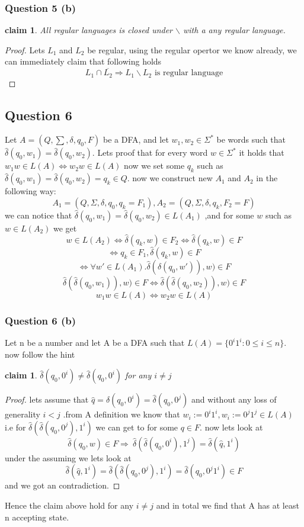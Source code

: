 \documentclass[12pt]{article}
\newtheorem{claim}[theorem]{claim}
\begin{document}
\subsubsection*{Question 5 (b)}
\begin{claim}
All regular languages is closed under $\backslash$ with a
any regular language.
\end{claim}
\begin{proof}
Lets $L_1$ and $L_2$ be regular, using the regular opertor  we know already, we can immediately claim that following holds 
\[ L_1 \cap \overline{L_2} \Rightarrow L_1\backslash L_2 \text{ is regular language} 
\]
\end{proof}
\subsection*{Question 6}
Let  $A=(Q,\sum,\delta,q_0,F)$ be a DFA, and let $w_1,w_2 \in \Sigma^*$ be words such that $\hat{\delta}(q_0, w_1) = \hat{\delta}(q_0, w_2).$
Lets proof that for every word $ w \in \Sigma^*$
it holds that $w_1w \in L(A) \Leftrightarrow w_2w \in L(A) $ 
now we set some $q_k$ such as \\$\hat{\delta}(q_0, w_1) = \hat{\delta}(q_0, w_2)=q_k \in Q$. now we construct new $A_1$ and $A_2$ in the following way:
\[ A_1=(Q,\Sigma ,\delta,q_0,q_k=F_1),
A_2=(Q,\Sigma ,\delta,q_k,F_2=F)
\]
we can notice that  $\hat{\delta}(q_0, w_1) = \hat{\delta}(q_0, w_2) \in L(A_1)$ ,and for some $w$ such as $w \in L(A_2)$ we get 
\[
w \in L(A_2) \Leftrightarrow  \hat{\delta}(q_k, w) \in F_2
 \Leftrightarrow  \hat{\delta}(q_k, w) \in F
 \]
 \[
  \Leftrightarrow  q_k \in F_1, \hat{\delta}(q_k, w)\in F  
  \]
 \[
  \Leftrightarrow \forall w'\in L(A_1).\hat{\delta} (\hat{\delta}(q_0,w')),w)\in F
   \]
 \[
    \hat{\delta} (\hat{\delta}(q_0,w_1)),w)\in F 
   \Leftrightarrow \hat{\delta} (\hat{\delta}(q_0,w_2)),w)\in F 
\]
 \[
   w_1w\in L(A)
   \Leftrightarrow    w_2w\in L(A)
\]
\subsubsection*{Question 6 (b)}
Let n be a number and let A be a DFA such that $L(A) = \lbrace0^
i1^
i
: 0 \leq
i \leq n\rbrace.
$
now follow the hint
\begin{claim}
$\hat{\delta}(q_0,0^i) \neq \hat{\delta}(q_0,0^i) $
for any $i\neq j$
\end{claim}
\begin{proof}
lets assume that $\hat{q}=\hat{\delta}(q_0,0^i) = \hat{\delta}(q_0,0^j) $ and without any loss of generality $i<j$ .from  A definition we know that $w_i:= 0^i1^i ,w_i:= 0^j1^j \in L(A)$ i.e for $\hat{\delta}(\hat{\delta}(q_0,0^j),1^i )$ we can get to for some $q\in F$. now lets look at 
 \[\hat{\delta}(q_0,w)\in F \Rightarrow\  \hat{\delta}(\hat{\delta}(q_0,0^i),1^j )=\hat{\delta}(\hat{q},1^i )
\]
under the assuming we lets look at 
\[\hat{\delta}(\hat{q},1^i )=\hat{\delta}(\hat{\delta}(q_0,0^j),1^i )=\hat{\delta}(q_0,0^j1^i)\in F
\]
and we got an contradiction.

\end{proof}
Hence the claim above hold for any $i\neq j$ and in total we find that A  has at least n accepting state.

  
\end{document}
